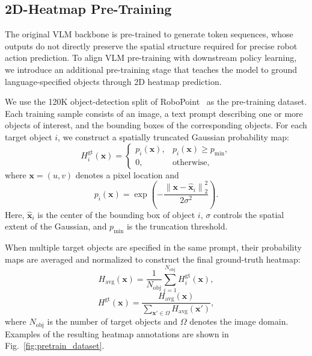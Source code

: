 \subsection{2D-Heatmap Pre-Training}
\label{sec:bridgevla:pretrain}

The original VLM backbone is pre-trained to generate token sequences, whose
outputs do not directly preserve the spatial structure required for precise
robot action prediction.
To align VLM pre-training with downstream policy learning, we introduce an
additional pre-training stage that teaches the model to ground
language-specified objects through 2D heatmap prediction.

We use the 120K object-detection split of
RoboPoint~\cite{yuan2024robopoint} as the pre-training dataset.
Each training sample consists of an image, a text prompt describing one or
more objects of interest, and the bounding boxes of the corresponding
objects.
For each target object $i$, we construct a spatially truncated Gaussian
probability map:
\begin{equation}
H_i^{\mathrm{gt}}(\mathbf{x})
=
\begin{cases}
p_i(\mathbf{x}),
&
p_i(\mathbf{x}) \geq p_{\min},
\\
0,
&
\text{otherwise},
\end{cases}
\label{eq:single_object_probability_map}
\end{equation}
where $\mathbf{x}=(u,v)$ denotes a pixel location and
\begin{equation}
p_i(\mathbf{x})
=
\exp
\left(
-\frac{
\left\|
\mathbf{x}-\widehat{\mathbf{x}}_i
\right\|_2^2
}{
2\sigma^2
}
\right).
\end{equation}
Here, $\widehat{\mathbf{x}}_i$ is the center of the bounding box of object
$i$, $\sigma$ controls the spatial extent of the Gaussian, and $p_{\min}$
is the truncation threshold.

When multiple target objects are specified in the same prompt, their
probability maps are averaged and normalized to construct the final
ground-truth heatmap:
\begin{equation}
H_{\mathrm{avg}}(\mathbf{x})
=
\frac{1}{N_{\mathrm{obj}}}
\sum_{i=1}^{N_{\mathrm{obj}}}
H_i^{\mathrm{gt}}(\mathbf{x}),
\end{equation}
\begin{equation}
H^{\mathrm{gt}}(\mathbf{x})
=
\frac{
H_{\mathrm{avg}}(\mathbf{x})
}{
\sum_{\mathbf{x}'\in\Omega}
H_{\mathrm{avg}}(\mathbf{x}')
},
\label{eq:multi_object_probability_map}
\end{equation}
where $N_{\mathrm{obj}}$ is the number of target objects and $\Omega$
denotes the image domain.
Examples of the resulting heatmap annotations are shown in
Fig.~\ref{fig:pretrain_dataset}.


